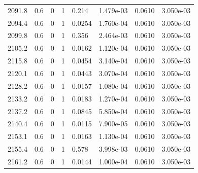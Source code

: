 \documentclass[preview]{standalone}
\begin{document}
{{{{{{{{{\begin{tabular}{L{1.2cm}C{1.2cm} C{0.3cm}C{0.5cm} C{1.4cm}C{1.4cm} C{1.4cm}C{1.4cm}}
  2091.8  &   0.6  & 0     &  1 &  0.214  & 1.479e-03  & 0.0610 &  3.050e-03   \\ 
  2094.4  &   0.6  & 0     &  1 &  0.0254  & 1.760e-04  & 0.0610 &  3.050e-03   \\ 
  2099.8  &   0.6  & 0     &  1 &  0.356  & 2.464e-03  & 0.0610 &  3.050e-03   \\ 
  2105.2  &   0.6  & 0     &  1 &  0.0162  & 1.120e-04  & 0.0610 &  3.050e-03   \\ 
  2115.8  &   0.6  & 0     &  1 &  0.0454  & 3.140e-04  & 0.0610 &  3.050e-03   \\ 
  2120.1  &   0.6  & 0     &  1 &  0.0443  & 3.070e-04  & 0.0610 &  3.050e-03   \\ 
  2128.2  &   0.6  & 0     &  1 &  0.0157  & 1.080e-04  & 0.0610 &  3.050e-03   \\ 
  2133.2  &   0.6  & 0     &  1 &  0.0183  & 1.270e-04  & 0.0610 &  3.050e-03   \\ 
  2137.2  &   0.6  & 0     &  1 &  0.0845  & 5.850e-04  & 0.0610 &  3.050e-03   \\ 
  2140.4  &   0.6  & 0     &  1 &  0.0115  & 7.900e-05  & 0.0610 &  3.050e-03   \\ 
  2153.1  &   0.6  & 0     &  1 &  0.0163  & 1.130e-04  & 0.0610 &  3.050e-03   \\ 
  2155.4  &   0.6  & 0     &  1 &  0.578  & 3.998e-03  & 0.0610 &  3.050e-03   \\ 
  2161.2  &   0.6  & 0     &  1 &  0.0144  & 1.000e-04  & 0.0610 &  3.050e-03   \\ 
\hline 
\end{tabular} 

}}}}}}}}}
\end{document}
